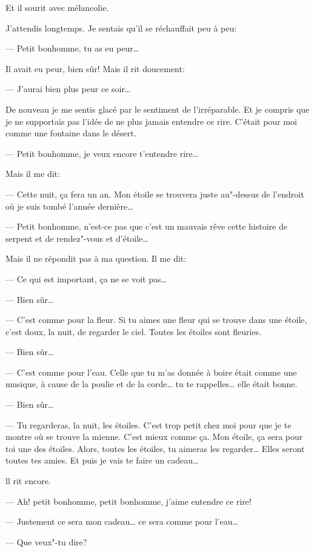 Et il sourit avec mélancolie.

J'attendis longtemps. Je sentais qu'il se réchauffait peu à peu:

--- Petit bonhomme, tu as eu peur\ldots{}

Il avait eu peur, bien sûr! Mais il rit doucement:

--- J'aurai bien plus peur ce soir\ldots{}

De nouveau je me sentis glacé par le sentiment de l'irréparable. Et je compris
que je ne supportais pas l'idée de ne plus jamais entendre ce rire. C'était
pour moi comme une fontaine dans le désert.

--- Petit bonhomme, je veux encore t'entendre rire\ldots{}

Mais il me dit:

--- Cette nuit, ça fera un an. Mon étoile se trouvera juste au"-dessus de
l'endroit où je suis tombé l'année dernière\ldots{}

--- Petit bonhomme, n'est-ce pas que c'est un mauvais rêve cette histoire de
serpent et de rendez"-vous et d'étoile\ldots{}

Mais il ne répondit pas à ma question. Il me dit:

--- Ce qui est important, ça ne se voit pas\ldots{}

--- Bien sûr\ldots{}

--- C'est comme pour la fleur. Si tu aimes une fleur qui se trouve dans une
étoile, c'est doux, la nuit, de regarder le ciel. Toutes les étoiles sont
fleuries.

--- Bien sûr\ldots{}

--- C'est comme pour l'eau. Celle que tu m'as donnée à boire était comme une
musique, à cause de la poulie et de la corde\ldots{} tu te rappelles\ldots{}
elle était bonne.

--- Bien sûr\ldots{}

--- Tu regarderas, la nuit, les étoiles. C'est trop petit chez moi pour que
je te montre où se trouve la mienne. C'est mieux comme ça. Mon étoile, ça
sera pour toi une des étoiles. Alors, toutes les étoiles, tu aimeras les
regarder\ldots{} Elles seront toutes tes amies. Et puis je vais te faire un
cadeau\ldots{}

ll rit encore.

--- Ah! petit bonhomme, petit bonhomme, j'aime entendre ce rire!

--- Justement ce sera mon cadeau\ldots{} ce sera comme pour l'eau\ldots{}

--- Que veux"-tu dire?


